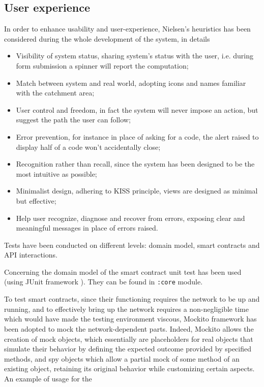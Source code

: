 \documentclass{scrartcl}
\begin{document}
\subsection{User experience}

In order to enhance usability and user-experience, Nielsen's heuristics has been considered during the whole development of the system, in details
\begin{itemize}
    \item Visibility of system status, sharing system's status with the user, i.e. during form submission a spinner will report the computation;
    \item Match between system and real world, adopting icons and names familiar with the catchment area;
    \item User control and freedom, in fact the system will never impose an action, but suggest the path the user can follow;
    \item Error prevention, for instance in place of asking for a code, the alert raised to display half of a code won't accidentally close;
    \item Recognition rather than recall, since the system has been designed to be the most intuitive as possible;
    \item Minimalist design, adhering to KISS principle, views are designed as minimal but effective;
    \item Help user recognize, diagnose and recover from errors, exposing clear and meaningful messages in place of errors raised.
\end{itemize}

\iffalse

Tests have been conducted on different levels: domain model, smart contracts and API interactions.

Concerning the domain model of the smart contract unit test has been used (using JUnit framework \cite{junit}).
%
They can be found in \texttt{:core} module.

To test smart contracts, since their functioning requires the network to be up and running, and to effectively bring up the network requires a non-negligible time which would have made the testing environment viscous, Mockito framework \cite{mockito} has been adopted to mock the network-dependent parts.
%
Indeed, Mockito allows the creation of mock objects, which essentially are placeholders for real objects that simulate their behavior by defining the expected outcome provided by specified methods, and spy objects which allow a partial mock of some method of an existing object, retaining its original behavior while customizing certain aspects.
%
An example of usage for the 
\end{document}
